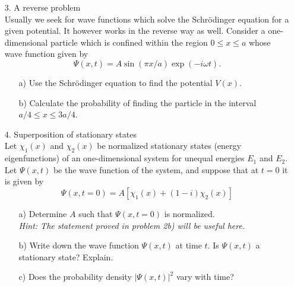\documentclass[11pt]{article}
\begin{document}
\begin{itemize}
\begin{itemize}
\end{itemize}
%
\vspace*{0.5cm}
%
\item[3.] A reverse problem\\
Usually we seek for wave functions which solve the Schr\"odinger equation for a given potential. It however works in the reverse way as well. Consider a one-dimensional particle which is confined within the region $0\le x\le a$ whose wave function given by
\begin{displaymath}
\Psi(x,t)= A \sin(\pi x/a)\exp(-i\omega t).
\end{displaymath}
\begin{itemize}
\item[a)]
Use the Schr\"odinger equation to find the potential $V(x)$.
\item[b)]
Calculate the probability of finding the particle in the interval $a/4 \le x \le 3a/4$.
\end{itemize}
%
\vspace*{0.5cm}
%
\item[4.] Superposition of stationary states\\
Let $\chi_1(x)$ and $\chi_2(x)$ be normalized stationary states (energy eigenfunctions)
of an one-dimensional system for unequal energies $E_1$ and $E_2$. Let $\Psi(x,t)$ be the wave function of the system,
and suppose that at $t=0$ it is given by
\begin{displaymath}
\Psi(x,t=0) =
A\left[ \chi_1(x) + (1-i)\chi_2(x) \right]
\end{displaymath}
\begin{itemize}
\item[a)]
Determine $A$ such that $\Psi(x,t=0)$ is normalized.\\
{\it Hint: The statement proved in problem 2b) will be useful here.}
\item[b)]
Write down the wave function $\Psi(x,t)$ at time $t$. Is $\Psi(x,t)$ a stationary state? Explain.
\item[c)]
Does the probability density $|\Psi(x,t)|^2$ vary with time?
\end{itemize}

%
\end{itemize}
%
\end{document}
